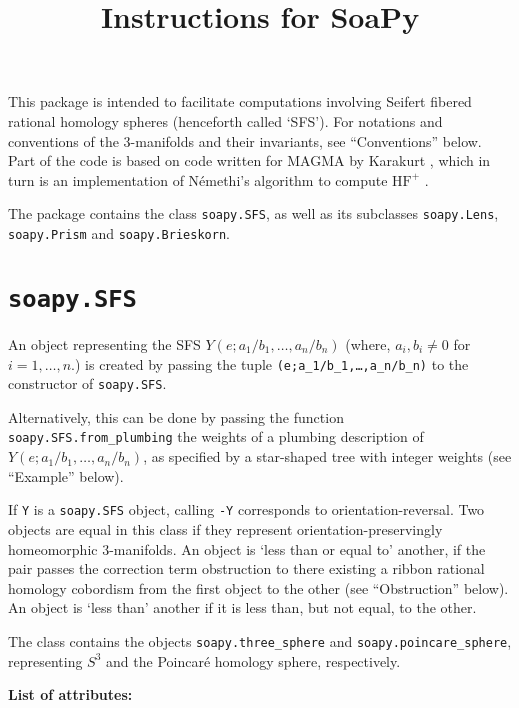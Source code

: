 \documentclass[12pt]{amsart}
\theoremstyle{definition}
\theoremstyle{remark}
\numberwithin{equation}{section}
\newcommand{\hfp}{\mathrm{HF}^{+}}
\begin{document}
\title{Instructions for SoaPy}
\vspace*{-3.5cm}
\maketitle
\thispagestyle{empty}

This package is intended to facilitate computations involving Seifert fibered rational homology spheres (henceforth called `SFS').
For notations and conventions of the $3$-manifolds and their invariants, see ``Conventions'' below.
Part of the code is based on code written for MAGMA by Karakurt \cite{Karakurt}, which in turn is an implementation of Némethi's algorithm to compute $\hfp$ \cite{Nemethi}. 

The package contains the class \texttt{soapy.SFS}, as well as its subclasses \texttt{soapy.Lens}, \texttt{soapy.Prism} and \texttt{soapy.Brieskorn}.

\section*{\texttt{soapy.SFS}}

An object representing the SFS $Y(e;a_{1}/b_{1},\dots,a_{n}/b_{n})$ (where, $a_{i},b_{i}\neq 0$ for $i=1,\dots,n$.) is created by passing the tuple \texttt{(e;a\_1/b\_1,\dots,a\_n/b\_n)} to the constructor of \texttt{soapy.SFS}.

Alternatively, this can be done by passing the function \texttt{soapy.SFS.from\_plumbing} the weights of a plumbing description of $Y(e;a_{1}/b_{1},\dots,a_{n}/b_{n})$, as specified by a star-shaped tree with integer weights (see ``Example'' below).

If \texttt{Y} is a \texttt{soapy.SFS} object, calling \texttt{-Y} corresponds to orientation-reversal.
Two objects are equal in this class if they represent orientation-preservingly homeomorphic $3$-manifolds.
An object is `less than or equal to' another, if the pair passes the correction term obstruction to there existing a ribbon rational homology cobordism from the first object to the other (see ``Obstruction'' below).
An object is `less than' another if it is less than, but not equal, to the other.

The class contains the objects \texttt{soapy.three\_sphere} and \texttt{soapy.poincare\_sphere}, representing $S^{3}$ and the Poincaré homology sphere, respectively.

\bigskip

\textbf{List of attributes:}
\end{document}
